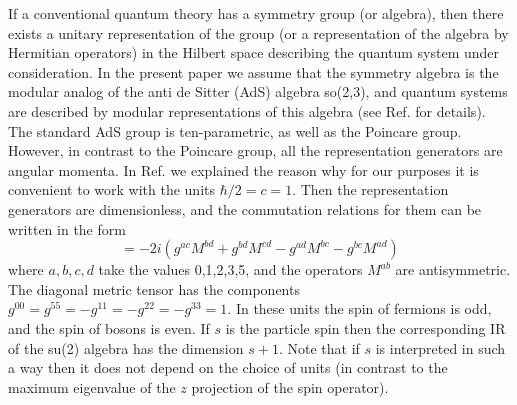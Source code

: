 \documentclass[a4paper,12pt]{article}%
\begin{document}
If a conventional quantum theory has a symmetry group (or
algebra), then there exists a unitary representation of 
the group (or a representation of the algebra by Hermitian
operators) in the Hilbert space describing the quantum 
system under consideration. In the present paper we assume
that the symmetry algebra is the modular analog of the 
anti de Sitter (AdS) algebra so(2,3), and quantum systems are
described by modular representations of this algebra (see
Ref. \cite{lev2} for details). The standard AdS group
is ten-parametric, as well as the Poincare group. However, 
in contrast to the Poincare group, all the representation 
generators are angular momenta. In Ref. \cite{lev2} we 
explained the reason why for our
purposes it is convenient to work with the units 
$\hbar/2=c=1$. Then the representation generators are
dimensionless, and the commutation relations for them can be 
written in the form
\begin{equation}
[M^{ab},M^{cd}]=-2i (g^{ac}M^{bd}+g^{bd}M^{cd}-
g^{ad}M^{bc}-g^{bc}M^{ad})
\label{1}
\end{equation}
where $a,b,c,d$ take the values 0,1,2,3,5, and the operators 
$M^{ab}$ are antisymmetric. The diagonal metric tensor has the 
components $g^{00}=g^{55}=-g^{11}=-g^{22}=-g^{33}=1$.  
In these units the spin of fermions is odd, and the spin of 
bosons is even. If $s$ is the particle spin then the 
corresponding IR of the su(2) algebra has the dimension
$s+1$. Note that if $s$ is interpreted in such a way then it
does not depend on the choice of units (in contrast to the
maximum eigenvalue of the $z$ projection of the spin
operator).    
\end{document}

